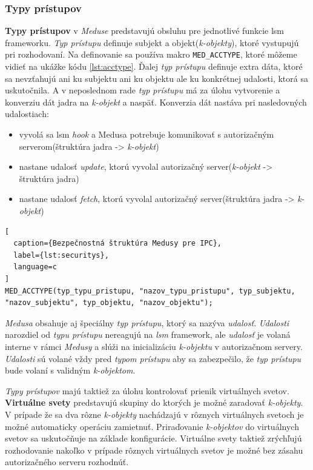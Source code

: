 \subsubsection{Typy prístupov} \label{acctype}
\textbf{Typy prístupov} v \textit{Meduse} predstavujú obsluhu pre jednotlivé funkcie \acrshort{lsm} frameworku. \textit{Typ prístupu} definuje subjekt a objekt(\textit{k-objekty}), ktoré vystupujú pri rozhodovaní. Na definovanie sa používa makro \texttt{MED\_ACCTYPE}, ktoré môžeme vidieť na ukážke kódu \ref{lst:acctype}. Ďalej \textit{typ prístupu} definuje extra dáta, ktoré sa nevzťahujú ani ku subjektu ani ku objektu ale ku konkrétnej udalosti, ktorá sa uskutočnila. A v neposlednom rade \textit{typ prístupu} má za úlohu vytvorenie a konverziu dát jadra na \textit{k-objekt} a naspäť. Konverzia dát nastáva pri nasledovných udalostiach:
\begin{itemize}
\item vyvolá sa \acrshort{lsm} \textit{hook} a Medusa potrebuje komunikovať s autorizačným serverom(štruktúra jadra -> \textit{k-objekt})
\item nastane udalosť \textit{update}, ktorú vyvolal autorizačný server(\textit{k-objekt} -> štruktúra jadra)
\item nastane udalosť \textit{fetch}, ktorú vyvolal autorizačný server(štruktúra jadra -> \textit{k-objekt})
\end{itemize}
\begin{lstlisting}[
  caption={Bezpečnostná štruktúra Medusy pre IPC},
  label={lst:securitys},
  language=c
]
MED_ACCTYPE(typ_typu_pristupu, "nazov_typu_pristupu", typ_subjektu, "nazov_subjektu", typ_objektu, "nazov_objektu");
\end{lstlisting} 
\textit{Medusa} obsahuje aj špeciálny \textit{typ prístupu}, ktorý sa nazýva \textit{udalosť}. \textit{Udalosti} narozdiel od \textit{typu prístupu} nereagujú na \textit{lsm} framework, ale \textit{udalosť} je volaná interne v rámci \textit{Medusy} a slúži na inicializáciu \textit{k-objektu} v autorizačnom servery.\cite{kacer} \textit{Udalosti} sú volané vždy pred \textit{typom prístupu} aby sa zabezpečilo, že \textit{typ prístupu} bude volaní s validným \textit{k-objektom}.

\textit{Typy prístupov} majú taktiež za úlohu kontrolovať prienik virtuálnych svetov. \textbf{Virtuálne svety} predstavujú skupiny do ktorých je možné zaradovať \textit{k-objekty}. V prípade že sa dva rôzne \textit{k-objekty} nachádzajú v rôznych virtuálnych svetoch je možné automaticky operáciu zamietnuť. Priraďovanie \textit{k-objektov} do virtuálnych svetov sa uskutočňuje na základe konfigurácie. Virtuálne svety taktiež zrýchľujú rozhodovanie nakoľko v prípade rôznych virtuálnych svetov je možné bez zásahu autorizačného serveru rozhodnúť.

